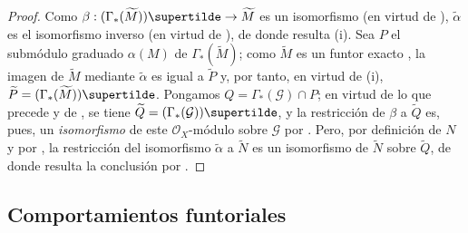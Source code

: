 \documentclass[oneside,10pt]{amsart}
\makeatletter
\newcommand{\ega@arrow}[2]{\mathchoice{#1}{#2}{#2}{#2}}
\renewcommand{\to}{\ega@arrow{\longrightarrow}{\rightarrow}}
\let\EGAOriginalLabel\label
\renewcommand{\label}[1]{\phantomsection\EGAOriginalLabel{#1}}
\makeatother
\begin{document}
\begin{proof}
Como $\beta:(\Gamma_*(\widetilde{M}))\supertilde
\to\widetilde{M}$ es un isomorfismo (en virtud de ), $\widetilde{\alpha}$ es el isomorfismo inverso (en virtud de ), de donde resulta (i).
Sea $P$ el submódulo graduado $\alpha(M)$ de $\Gamma_*(\widetilde{M})$;
como $\widetilde{M}$ es un funtor exacto , la imagen de $\widetilde{M}$ mediante $\widetilde{\alpha}$ es igual a $\widetilde{P}$ y, por tanto, en virtud de (i), $\widetilde{P}=(\Gamma_*(\widetilde{M}))\supertilde$.
Pongamos $Q=\Gamma_*(\mathcal{G})\cap P$; en virtud de lo que precede y de , se tiene $\widetilde{Q}=(\Gamma_*(\mathcal{G}))\supertilde$, y la restricción de $\beta$ a $\widetilde{Q}$ es, pues, un \emph{isomorfismo} de este $\mathcal{O}_X$-módulo sobre $\mathcal{G}$ por .
Pero, por definición de $N$ y por , la restricción del isomorfismo $\widetilde{\alpha}$ a $\widetilde{N}$ es un isomorfismo de $\widetilde{N}$ sobre $\widetilde{Q}$, de donde resulta la conclusión por .
\end{proof}

\subsection{Comportamientos funtoriales}
\label{subsection:II.2.8-fr}
\end{document}
